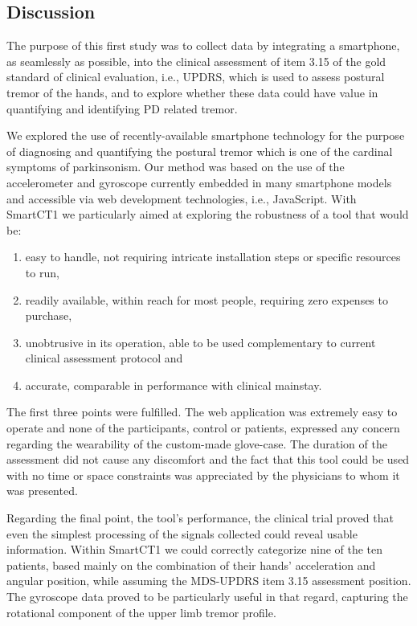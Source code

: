 \subsection{Discussion}
\label{subsec:SmartCT1Discussion}
The purpose of this first study was to collect data by integrating a smartphone, as seamlessly as possible, into the clinical assessment of item 3.15 of the gold standard of clinical evaluation, i.e., \gls{UPDRS}, which is used to assess postural tremor of the hands, and to explore whether these data could have value in quantifying and identifying \gls{PD} related tremor. 

We explored the use of recently-available smartphone technology for the purpose of diagnosing and quantifying the postural tremor which is one of the cardinal symptoms of parkinsonism. Our method was based on the use of the accelerometer and gyroscope currently embedded in many smartphone models and accessible via web development technologies, i.e., JavaScript. 
With \gls{SmartCT1} we particularly aimed at exploring the robustness of a tool that would be:

\begin{enumerate}
\item easy to handle, not requiring intricate installation steps or specific resources to run, 
\item readily available, within reach for most people, requiring zero expenses to purchase,
\item unobtrusive in its operation, able to be used complementary to current clinical assessment protocol and
\item accurate, comparable in performance with clinical mainstay.
\end{enumerate}

The first three points were fulfilled. The web application was extremely easy to operate and none of the participants, control or patients, expressed any concern regarding the wearability of the custom-made glove-case. The duration of the assessment did not cause any discomfort and the fact that this tool could be used with no time or space constraints was appreciated by the physicians to whom it was presented. 

Regarding the final point, the tool's performance, the clinical trial proved that even the simplest processing of the signals collected could reveal usable information. Within \gls{SmartCT1} we could correctly categorize nine of the ten patients, based mainly on the combination of their hands' acceleration and angular position, while assuming the \gls{MDS}-\gls{UPDRS} item 3.15 assessment position. The gyroscope data proved to be particularly useful in that regard, capturing the rotational component of the upper limb tremor profile. 

